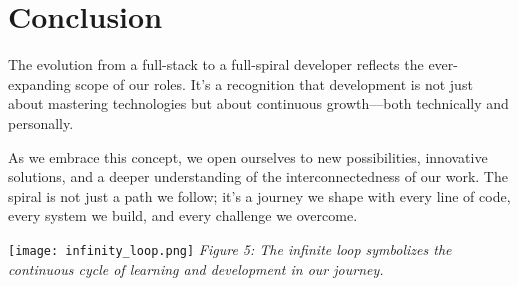 \documentclass[../../main.tex]{subfiles}
\begin{document}
    \section{Conclusion}

    The evolution from a full-stack to a full-spiral developer reflects the ever-expanding scope of our roles. It's a recognition that development is not just about mastering technologies but about continuous growth—both technically and personally.

    As we embrace this concept, we open ourselves to new possibilities, innovative solutions, and a deeper understanding of the interconnectedness of our work. The spiral is not just a path we follow; it's a journey we shape with every line of code, every system we build, and every challenge we overcome.

    \vspace{0.5cm}
    \noindent\texttt{[image: infinity\_loop.png]}
    \newline
    \textit{Figure 5: The infinite loop symbolizes the continuous cycle of learning and development in our journey.}
    \vspace{0.5cm}
\end{document}

